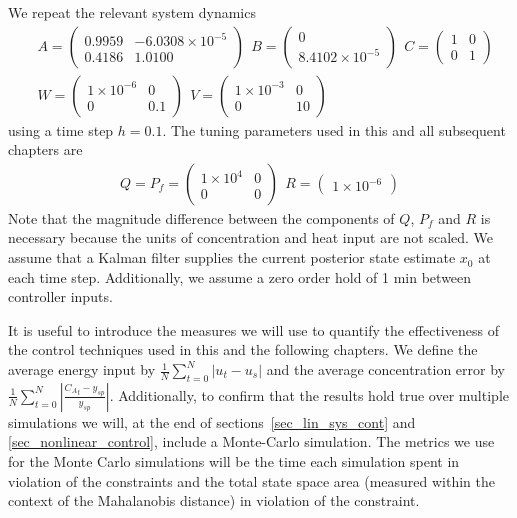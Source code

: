We repeat the relevant system dynamics  
\begin{equation}
\begin{aligned}
&A = \begin{pmatrix}
0.9959 & -6.0308\times 10^{-5} \\
0.4186 & 1.0100
\end{pmatrix}
~~B = \begin{pmatrix}
0 \\ 8.4102\times 10^{-5}
\end{pmatrix} ~~
C = \begin{pmatrix}
1 & 0 \\ 0 & 1
\end{pmatrix} \\
&W = \begin{pmatrix}
1\times 10^{-6} & 0 \\ 0 & 0.1
\end{pmatrix} ~~
V = \begin{pmatrix}
1\times 10^{-3} & 0 \\ 0 & 10
\end{pmatrix}
\end{aligned}
\label{eq_linmod_params}
\end{equation}
using a time step $h=0.1$. The tuning parameters used in this and all subsequent chapters are 
\begin{equation}
\begin{aligned}
Q = P_f = \begin{pmatrix}
1\times 10^{4} & 0 \\ 0 & 0
\end{pmatrix} 
~~R = \begin{pmatrix}
1\times 10^{-6}
\end{pmatrix}
\end{aligned}
\label{eq_mpc_tuning}
\end{equation}
Note that the magnitude difference between the components of $Q$, $P_f$ and $R$ is necessary because the units of concentration and heat input are not scaled. We assume that a Kalman filter supplies the current posterior state estimate $x_0$ at each time step. Additionally, we assume a zero order hold of 1 min between controller inputs.

It is useful to introduce the measures we will use to quantify the effectiveness of the control techniques used in this and the following chapters. We define the average energy input by $\frac{1}{N}\sum^N_{t=0}|u_t-u_s|$ and the average concentration error by $\frac{1}{N}\sum^N_{t=0}|\frac{{C_A}_t-y_{sp}}{y_{sp}}|$. Additionally, to confirm that the results hold true over multiple simulations we will, at the end of sections~\ref{sec_lin_sys_cont} and \ref{sec_nonlinear_control}, include a Monte-Carlo simulation. The metrics we use for the Monte Carlo simulations will be the time each simulation spent in violation of the constraints and the total state space area (measured within the context of the Mahalanobis distance) in violation of the constraint.  

